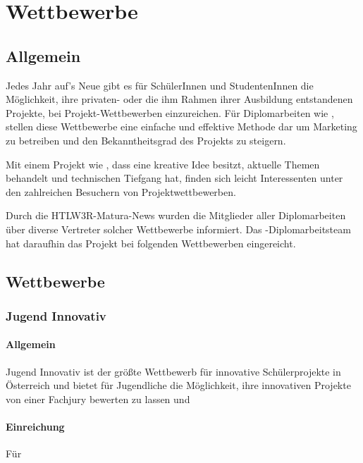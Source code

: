 \chapter{Wettbewerbe}
\renewcommand{\kapitelautor}{Autor: Andreas Novak}

\section{Allgemein}
Jedes Jahr auf's Neue gibt es für SchülerInnen und StudentenInnen die Möglichkeit, ihre privaten-
oder die ihm Rahmen ihrer Ausbildung entstandenen Projekte, bei Projekt-Wettbewerben
einzureichen. Für Diplomarbeiten wie \sblit, stellen diese Wettbewerbe eine einfache und effektive
Methode dar um Marketing zu betreiben und den Bekanntheitsgrad des Projekts zu steigern.

Mit einem Projekt wie \sblit, dass eine kreative Idee besitzt, aktuelle Themen behandelt und technischen Tiefgang hat,
finden sich leicht Interessenten unter den zahlreichen Besuchern von Projektwettbewerben.

Durch die HTLW3R-Matura-News wurden die Mitglieder aller Diplomarbeiten über diverse Vertreter
solcher Wettbewerbe informiert. Das \sblit-Diplomarbeitsteam hat daraufhin das Projekt bei folgenden
Wettbewerben eingereicht.

\section{Wettbewerbe}
\subsection{Jugend Innovativ}
\subsubsection{Allgemein}
Jugend Innovativ ist der größte Wettbewerb für innovative Schülerprojekte in Österreich und
bietet für Jugendliche die Möglichkeit, ihre innovativen Projekte von einer Fachjury bewerten zu lassen
und

\subsubsection{Einreichung}
Für

